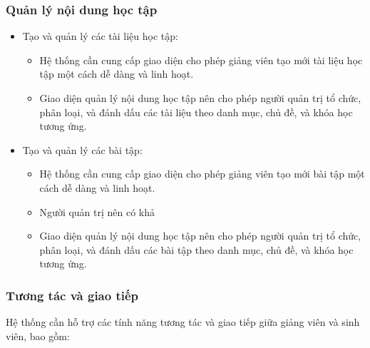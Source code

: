 \documentclass[../Thesis.tex]{subfiles}
\begin{document}
        \subsubsection{Quản lý nội dung học tập}

            \begin{itemize}
                \item Tạo và quản lý các tài liệu học tập:
                    \begin{itemize}
                        
                        \item Hệ thống cần cung cấp giao diện cho phép giảng viên tạo mới tài liệu học tập một cách dễ dàng và linh hoạt.
                        
                        \item Giao diện quản lý nội dung học tập nên cho phép người quản trị tổ chức, phân loại, và đánh dấu các tài liệu theo danh mục, chủ đề, và khóa học tương ứng.
                    \end{itemize}

                \item Tạo và quản lý các bài tập:
                    \begin{itemize}
                        \item Hệ thống cần cung cấp giao diện cho phép giảng viên tạo mới bài tập một cách dễ dàng và linh hoạt.
                        \item Người quản trị nên có khả
                        \item Giao diện quản lý nội dung học tập nên cho phép người quản trị tổ chức, phân loại, và đánh dấu các bài tập theo danh mục, chủ đề, và khóa học tương ứng.
                    \end{itemize}
            \end{itemize}

        \subsubsection{Tương tác và giao tiếp}

            Hệ thống cần hỗ trợ các tính năng tương tác và giao tiếp giữa giảng viên và sinh viên, bao gồm:
\end{document}
